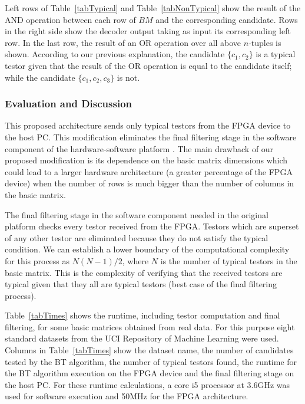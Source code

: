 \documentclass[authoryear,11pt]{elsarticle}
\begin{document}
	Left rows of Table~\ref{tabTypical} and Table~\ref{tabNonTypical} show the result of the AND operation 
	between each row of $BM$ and the corresponding candidate. Rows in the right side show the decoder output 
	taking as input its corresponding left row. In the last row, the result of an OR operation over all 
	above $n$-tuples is shown. According to our previous explanation, the candidate $\{c_1,c_2\}$ is a 
	typical testor given that the result of the OR operation is equal to the candidate itself; while the
	candidate $\{c_1,c_2,c_3\}$ is not.
	
\subsubsection{Evaluation and Discussion}
	This proposed architecture sends only typical testors from the FPGA device to the 
	host PC. This modification eliminates the final filtering stage in the software component of the 
	hardware-software platform \citep{Rojas12}. The main drawback of our proposed modification is its 
	dependence on the basic matrix dimensions which could lead to a larger hardware architecture (a greater
	percentage of the FPGA device) when the number of rows is much bigger than the number of columns in the basic 
	matrix. 
	
	The final filtering stage in the software component needed in the original platform \citep{Rojas12} checks 
	every testor received from the FPGA. Testors which are superset of any other testor are 
	eliminated because they do not satisfy the typical condition. We 
	can establish a lower boundary of the computational complexity for this process as $N(N-1)/2$, 
	where $N$ is the number of typical testors in the basic matrix. This is the complexity of verifying that
	the received testors are typical given that they all are typical testors (best case of the final filtering 
	process).
	
	Table~\ref{tabTimes} shows the runtime, including testor computation and final filtering, 
	for some basic matrices obtained from real data. For this purpose eight standard datasets from the UCI
	Repository of Machine Learning \citep{Bache13} were used.
	Columns in Table~\ref{tabTimes} show the dataset name, the number of candidates tested by the BT algorithm,
	the number of typical testors found, the runtime for the BT algorithm execution on the 
	FPGA device and the final filtering stage on the host PC. For these runtime calculations, 
	a core i5 processor at 3.6GHz was used for software execution and 50MHz for the FPGA architecture.
	
\end{document}
